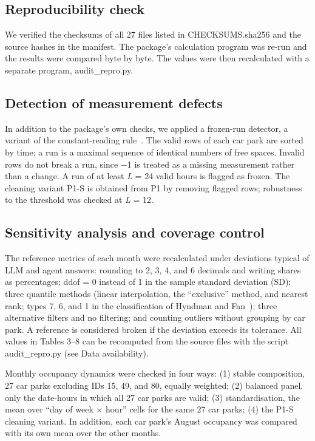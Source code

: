\documentclass[default]{subfiles}
\begin{document}
{\subsection{Reproducibility check}

We verified the checksums of all 27 files listed in CHECKSUMS.sha256 and the source hashes in the manifest. The package's calculation program was re-run and the results were compared byte by byte. The values were then recalculated with a separate program, audit\_repro.py.

\subsection{Detection of measurement defects}

In addition to the package's own checks, we applied a frozen-run detector, a variant of the constant-reading rule~\cite{sharma2010}. The valid rows of each car park are sorted by time; a run is a maximal sequence of identical numbers of free spaces. Invalid rows do not break a run, since $-$1 is treated as a missing measurement rather than a change. A run of at least \emph{L} = 24 valid hours is flagged as frozen. The cleaning variant P1-S is obtained from P1 by removing flagged rows; robustness to the threshold was checked at \emph{L} = 12.

\subsection{Sensitivity analysis and coverage control}

The reference metrics of each month were recalculated under deviations typical of LLM and agent answers: rounding to 2, 3, 4, and 6 decimals and writing shares as percentages; ddof = 0 instead of 1 in the sample standard deviation (SD); three quantile methods (linear interpolation, the ``exclusive'' method, and nearest rank; types 7, 6, and 1 in the classification of Hyndman and Fan~\cite{hyndman1996}); three alternative filters and no filtering; and counting outliers without grouping by car park. A reference is considered broken if the deviation exceeds its tolerance. All values in Tables 3--8 can be recomputed from the source files with the script audit\_repro.py (see Data availability).

Monthly occupancy dynamics were checked in four ways: (1) stable composition, 27 car parks excluding IDs 15, 49, and 80, equally weighted; (2) balanced panel, only the date-hours in which all 27 car parks are valid; (3) standardisation, the mean over ``day of week $\times$ hour'' cells for the same 27 car parks; (4) the P1-S cleaning variant. In addition, each car park's August occupancy was compared with its own mean over the other months.

}
\end{document}
